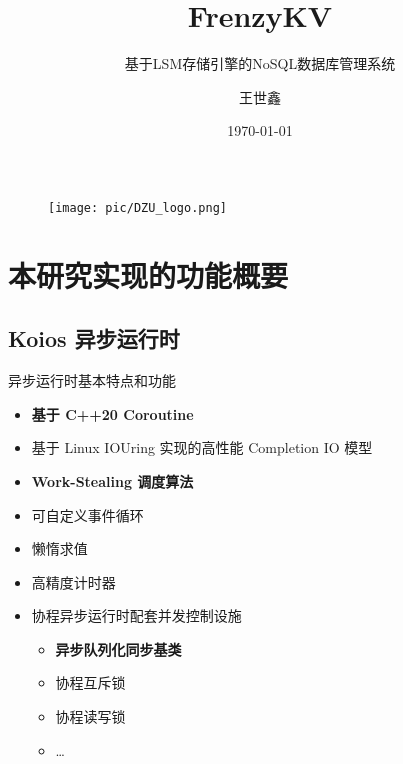 \documentclass{beamer}
\author[Wang Shixin]{王世鑫}
\title{FrenzyKV}
\subtitle{基于LSM存储引擎的NoSQL数据库管理系统}
\institute{德州学院计算机与信息学院}
\date{\today}
\begin{document}
\begin{frame}
    \begin{figure}[htpb]
       \begin{center}
            \texttt{[image: pic/DZU\_logo.png]}
        \end{center}
    \end{figure}
    \titlepage
\end{frame}

\begin{frame}
    \tableofcontents[sectionstyle=show,subsectionstyle=show/shaded/hide,subsubsectionstyle=show/shaded/hide]
\end{frame}

\section{本研究实现的功能概要}
\subsection{Koios 异步运行时}

\begin{frame}{异步运行时基本特点和功能}
	\begin{itemize}
        \item \textbf{基于 C++20 Coroutine}
        \item 基于 Linux IOUring 实现的高性能 Completion IO 模型
        \item \textbf{Work-Stealing 调度算法\cite{le_correct_nodate}}
        \item 可自定义事件循环
        \item 懒惰求值
        \item 高精度计时器 
        \item 协程异步运行时配套并发控制设施
        \begin{itemize}
            \item \textbf{异步队列化同步基类}
            \item 协程互斥锁
            \item 协程读写锁　
            \item \dots
        \end{itemize}
	\end{itemize}
\end{frame}
\end{document}
